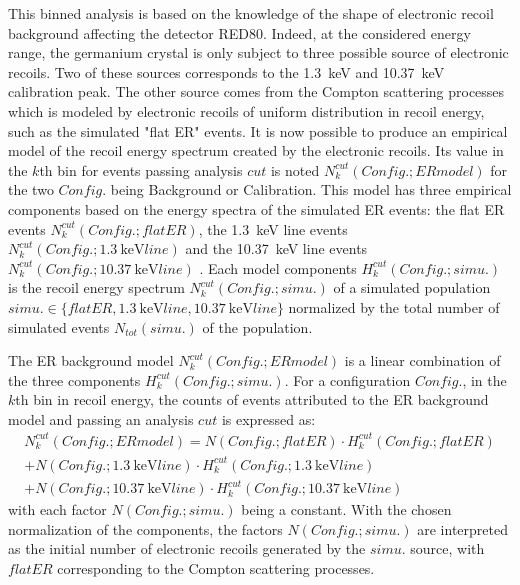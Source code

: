This binned analysis is based on the knowledge of the shape of electronic recoil background affecting the detector RED80. Indeed, at the considered energy range, the germanium crystal is only subject to three possible source of electronic recoils. Two of these sources corresponds to the \SI{1.3}{\kilo\eV} and \SI{10.37}{\kilo\eV} calibration peak. The other source comes from the Compton scattering processes which is modeled by electronic recoils of uniform distribution in recoil energy, such as the simulated "flat ER" events. It is now possible to produce an empirical model of the recoil energy spectrum created by the electronic recoils. Its value in the $k$th bin for events passing analysis $cut$ is noted $N_k^{cut}(Config.; ER model)$ for the two $Config.$ being Background or Calibration. This model has three empirical components based on the energy spectra of the simulated ER events: the flat ER events $N_k^{cut}(Config.; flat ER)$, the \SI{1.3}{\kilo\eV} line events $N_k^{cut}(Config.; \SI{1.3}{\kilo\eV} line)$ and the \SI{10.37}{\kilo\eV} line events $N_k^{cut}(Config.; \SI{10.37}{\kilo\eV} line)$ . Each model components $H_k^{cut}(Config.; simu.)$ is the recoil energy spectrum $N_k^{cut}(Config.; simu.)$ of a simulated population $simu. \in \{flat ER, \SI{1.3}{\kilo\eV} line, \SI{10.37}{\kilo\eV} line \}$ normalized by the total number of simulated events $N_{tot}(simu.)$ of the population. 

The ER background model $N_k^{cut}(Config.; ER model)$  is a linear combination of the three components $H_k^{cut}(Config.; simu.)$. For a configuration $Config.$, in the $k$th bin in recoil energy, the counts of events attributed to the ER background model and passing an analysis $cut$  is expressed as:
\begin{multline}
N_k^{cut}(Config.; ER model)
=
N(Config.; flat ER) \cdot H_k^{cut}(Config.; flat ER) \\
+ N(Config.; \SI{1.3}{\kilo\eV} line) \cdot H_k^{cut}(Config.; \SI{1.3}{\kilo\eV} line) \\
+ N(Config.; \SI{10.37}{\kilo\eV} line) \cdot H_k^{cut}(Config.; \SI{10.37}{\kilo\eV} line)
\end{multline}
with each factor $N(Config.; simu.)$ being a constant. With the chosen normalization of the components, the factors $N(Config.; simu.)$ are interpreted as the initial number of electronic recoils generated by the $simu.$ source, with $flatER$ corresponding to the Compton scattering processes.


